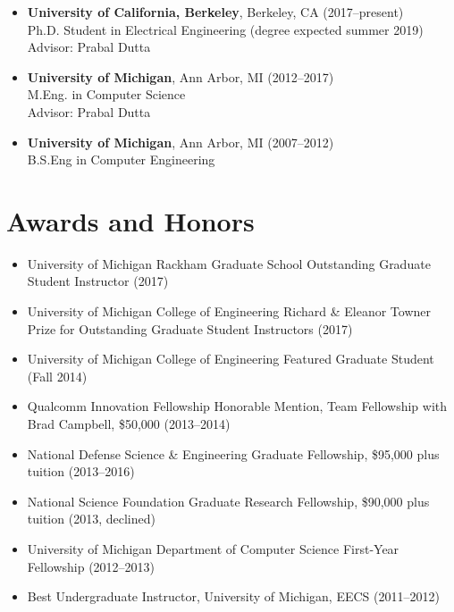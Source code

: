 \documentclass{article}
\begin{document}
\begin{itemize}
  \item[]
    \textbf{University of California, Berkeley}, Berkeley, CA (2017--present) \\
    Ph.D. Student in Electrical Engineering (degree expected summer 2019) \\
    Advisor: Prabal Dutta

  \item[]
    \textbf{University of Michigan}, Ann Arbor, MI (2012--2017) \\
    M.Eng. in Computer Science \\
    Advisor: Prabal Dutta

  \item[]
    \textbf{University of Michigan}, Ann Arbor, MI (2007--2012) \\
    B.S.Eng in Computer Engineering
\end{itemize}

\section*{Awards and Honors}

\begin{itemize}

  \item[] University of Michigan Rackham Graduate School Outstanding Graduate Student Instructor (2017)
  \item[] University of Michigan College of Engineering Richard \& Eleanor Towner Prize for Outstanding Graduate Student Instructors (2017)
  \item[] University of Michigan College of Engineering Featured Graduate Student (Fall 2014)
  \item[] Qualcomm Innovation Fellowship Honorable Mention, Team Fellowship with Brad Campbell, \$50,000 (2013--2014)
  \item[] National Defense Science \& Engineering Graduate Fellowship, \$95,000 plus tuition (2013--2016)
  \item[] National Science Foundation Graduate Research Fellowship, \$90,000 plus tuition (2013, declined)
  \item[] University of Michigan Department of Computer Science First-Year Fellowship (2012--2013)
  \item[] Best Undergraduate Instructor, University of Michigan, EECS (2011--2012)

\end{itemize}
\end{document}

